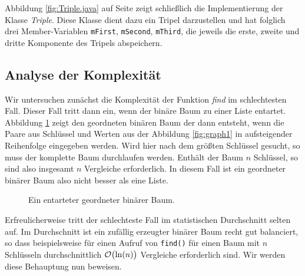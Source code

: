 \noindent
Abbildung \ref{fig:Triple.java} auf Seite \pageref{fig:Triple.java} zeigt schlie{\ss}lich die
Implementierung der Klasse \textsl{Triple}.  Diese Klasse dient dazu ein Tripel
darzustellen und hat folglich drei Member-Variablen \texttt{mFirst}, \texttt{mSecond},
\texttt{mThird}, die jeweils die erste, zweite und dritte Komponente des Tripels abspeichern.
\pagebreak



\subsection{Analyse der Komplexit\"at}
Wir untersuchen zun\"achst die Komplexit\"at der Funktion \textsl{find} im schlechtesten Fall.
Dieser Fall tritt dann ein, wenn der bin\"are Baum zu einer Liste entartet.  Abbildung
\ref{fig:degenerated} zeigt den geordneten bin\"aren Baum der dann entsteht, wenn die Paare
aus Schl\"ussel und Werten aus der Abbildung
\ref{fig:graph1} in aufsteigender Reihenfolge eingegeben werden.  Wird hier nach dem
gr\"o{\ss}ten Schl\"ussel gesucht, so muss der komplette Baum durchlaufen werden.  Enth\"alt der Baum
$n$ Schl\"ussel, so sind also insgesamt $n$ Vergleiche erforderlich.  In diesem Fall ist ein
geordneter bin\"arer Baum also nicht besser als eine Liste.

\begin{figure}[!th]
  \centering
  \caption{Ein entarteter  geordneter bin\"arer Baum.}
  \label{fig:degenerated}
\end{figure}

Erfreulicherweise tritt der schlechteste Fall im statistischen Durchschnitt selten auf.
Im Durchschnitt ist ein zuf\"allig erzeugter bin\"arer Baum recht gut balanciert, so dass 
beispielsweise f\"ur einen Aufruf von \texttt{find()} f\"ur einen Baum mit $n$ Schl\"usseln
durchschnittlich  $\mathcal{O}\bigl(\ln(n)\bigr)$
Vergleiche erforderlich sind. Wir werden diese Behauptung nun beweisen.




